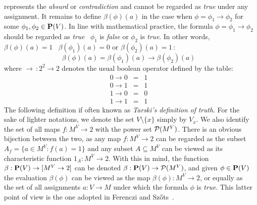 represents the {\em absurd} or {\em contradiction} and cannot be
regarded as {\em true} under any assignment. It remains to define
$\beta(\phi)(a)$ in the case when $\phi=\phi_{1}\to\phi_{2}$ for
some $\phi_{1},\phi_{2}\in\mbox{${\bf P}(V)$}$. In line with mathematical practice,
the formula $\phi=\phi_{1}\to\phi_{2}$ should be regarded as {\em
true} \ifand\ $\phi_{1}$ is {\em false} or $\phi_{2}$ is {\em true}.
In other words, $\beta(\phi)(a)=1$ \ifand\ $\beta(\phi_{1})(a)=0$ or
$\beta(\phi_{2})(a)=1$\,:
    \[
    \beta(\phi)(a)=\beta(\phi_{1})(a)\to\beta(\phi_{2})(a)
    \]
where $\to\,:2^2\to 2$ denotes the usual boolean operator defined by
the table:
    \begin{eqnarray*}
    0\to 0&=&1\\
    0\to 1&=&1\\
    1\to 0&=&0\\
    1\to 1&=&1
    \end{eqnarray*}
The following definition if often known as {\em Tarski's definition
of truth}. For the sake of lighter notations, we denote the set
$V\setminus\{x\}$ simply by $V_{x}$. We also identify the set of all
maps $f:M^{V}\to 2$ with the power set ${\cal P}(M^{V})$. There is
an obvious bijection between the two, as any map $f:M^{V}\to 2$ can
be regarded as the subset $A_{f}=\{a\in M^{V}:f(a)=1\}$ and any
subset $A\subseteq M^{V}$ can be viewed as its characteristic
function $1_{A}:M^{V}\to 2$. With this in mind, the function
$\beta:\mbox{${\bf P}(V)$}\to [M^{V}\to 2]$ can be denoted $\beta:\mbox{${\bf P}(V)$}\to{\cal
P}(M^{V})$, and given $\phi\in\mbox{${\bf P}(V)$}$ the evaluation $\beta(\phi)$ can
be viewed as the map $\beta(\phi):M^{V}\to 2$, or equally as the set
of all assignments $a:V\to M$ under which the formula $\phi$ is {\em
true}. This latter point of view is the one adopted in Ferenczi and
Sz\H ots~\cite{Ferenczi}.

